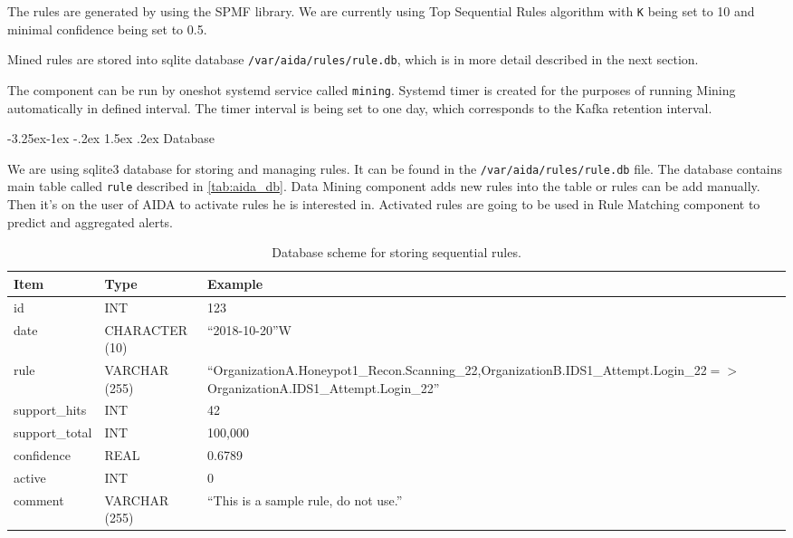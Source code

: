 \documentclass[a4paper]{article} %
\makeatletter
\renewcommand\subsection{\@startsection{subsection}{2}{\z@}%
                   {-3.25ex\@plus -1ex \@minus -.2ex}%
                   {1.5ex \@plus .2ex}%
                   {\normalfont\sffamily\large\bfseries\color{projectcolor}}}
\makeatother
\begin{document}
The rules are generated by using the SPMF library. We are currently using Top Sequential Rules algorithm with \texttt{K} being set to 10 and minimal confidence being set to 0.5.

Mined rules are stored into sqlite database \texttt{/var/aida/rules/rule.db}, which is in more detail described in the next section.

The component can be run by oneshot systemd service called \texttt{mining}. Systemd timer is created for the purposes of running Mining automatically in defined interval. The timer interval is being set to one day, which corresponds to the Kafka retention interval.


\subsection{Database}

We are using sqlite3 database for storing and managing rules. It can be found in the \texttt{/var/aida/rules/rule.db} file. The database contains main table called \texttt{rule} described in \autoref{tab:aida_db}. Data Mining component adds new rules into the table or rules can be add manually. Then it's on the user of AIDA to activate rules he is interested in. Activated rules are going to be used in Rule Matching component to predict and aggregated alerts.

\begin{table}[h]
\centering
\caption{Database scheme for storing sequential rules.}
\label{tab:aida_db}
\begin{tabular}{| l | l | m{9cm} |}
\hline
\rowcolor{gray!15}\textbf{Item} & \textbf{Type} & \textbf{Example} \\
\hline \hline
id             & INT            & 123        \\ \hline
date           & CHARACTER (10) & ``2018-10-20''W \\ \hline
rule           & VARCHAR (255)  & ``OrganizationA.Honeypot1\_Recon.Scanning\_22,\newline OrganizationB.IDS1\_Attempt.Login\_22\newline $=>$ OrganizationA.IDS1\_Attempt.Login\_22'' \\ \hline
support\_hits  & INT            & 42      \\ \hline
support\_total & INT            & 100,000 \\ \hline
confidence     & REAL           & 0.6789  \\ \hline
active         & INT            & 0       \\ \hline
comment        & VARCHAR (255)  & ``This is a sample rule, do not use.'' \\ \hline
\end{tabular}
\end{table}
\end{document}
